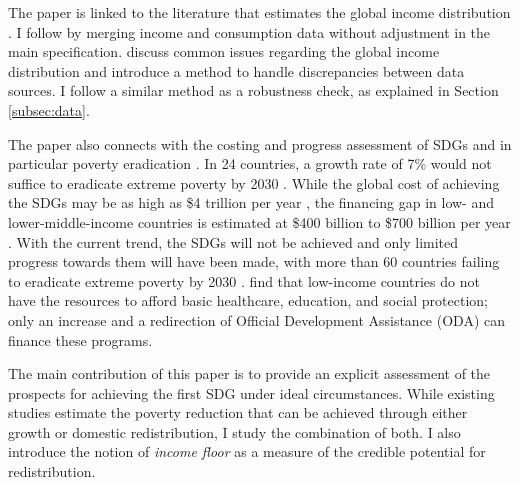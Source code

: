 \documentclass[12pt,english]{article}
\begin{document}
The paper is linked to the literature that estimates the global income distribution \citep{pinkovskiy_parametric_2009,anand_chapter_2015,lahoti_global_2016,lakner_global_2016,gradin_trends_2021,jorda_global_2019,alvaredo_methods_2021,fisher-post_government_2023,milanovic_three_2024}. 
I follow \cite{lakner_global_2016} by merging income and consumption data without adjustment in the main specification. 
\cite{anand_chapter_2015} discuss common issues regarding the global income distribution and introduce a method to handle discrepancies between data sources. I follow a similar method as a robustness check, as explained in Section \ref{subsec:data}. 

The paper also connects with the costing and progress assessment of SDGs and in particular poverty eradication \citep{schmidt-traub_investment_2015,rozenberg_beyond_2019,sdsn_sdg_2019,manuel_financing_2020,vorisek_understanding_2020,unctad_estimating_2021,un_sustainable_2022}. In 24 countries, a growth rate of 7\% would not suffice to eradicate extreme poverty by 2030 \citep{unctad_estimating_2021}. While the global cost of achieving the SDGs may be as high as \$4 trillion per year \citep{unctad_world_2023}, %
the financing gap in low- and lower-middle-income countries is estimated at \$400 billion \citep{sdsn_sdg_2019} %
to \$700 billion per year \citep{kharas_building_2019}. %
With the current trend, the SDGs will not be achieved and only limited progress towards them will have been made, with more than 60 countries failing to eradicate extreme poverty by 2030 \citep{moyer_are_2020}. %
\cite{manuel_financing_2018} find that low-income countries do not have the resources to afford basic healthcare, education, and social protection; only an increase and a redirection of Official Development Assistance (ODA) can finance these programs. 

The main contribution of this paper is to provide an explicit assessment of the prospects for achieving the first SDG under ideal circumstances. While existing studies estimate the poverty reduction that can be achieved through either growth or domestic redistribution, I study the combination of both. I also introduce the notion of \textit{income floor} as a measure of the credible potential for redistribution. %
\end{document}
